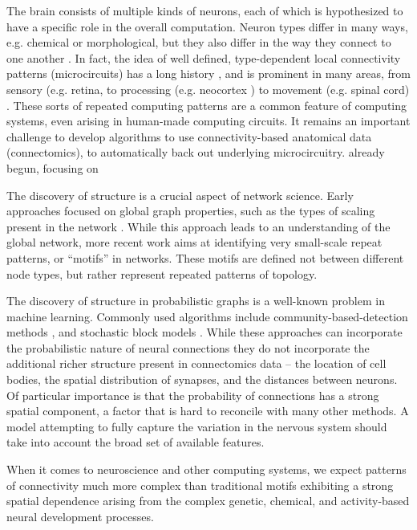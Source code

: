 \documentclass{article}
\begin{document}
The brain consists of multiple kinds of neurons, each of which is
hypothesized to have a specific role in the overall
computation. Neuron types differ in many ways, e.g. chemical or
morphological, but they also differ in the way they connect to one
another \autocite{Seung2014}. In fact, the idea of well defined,
type-dependent local connectivity patterns (microcircuits) has a long
history \autocite{Passingham2002}, and is prominent in many areas,
from sensory (e.g. retina, \autocite{Masland2001} to processing
(e.g. neocortex \autocite{Mountcastle1997}) to movement (e.g. spinal
cord) \autocite{Grillner2005}.  These sorts of repeated computing
patterns are a common feature of computing systems, even arising in
human-made computing circuits. It remains an important challenge to
develop algorithms to use connectivity-based anatomical data
(connectomics), to automatically back out underlying microcircuitry.
already begun, focusing on

The discovery of structure is a crucial aspect of network
science. Early approaches focused on global graph properties, such as
the types of scaling present in the network \autocite
{WattsStrogatz1998}.  While this approach leads to an understanding
of the global network, more recent work aims at identifying very small-scale
repeat patterns, or “motifs” in networks\autocite{Milo2002}. These motifs
are defined not between different node types, but rather represent repeated
patterns of topology. 

The discovery of structure in probabilistic graphs is a well-known
problem in machine learning. Commonly used algorithms include
community-based-detection methods \autocite{Girvan2002}, and
stochastic block models \autocite{Nowicki2001}.  While these
approaches can incorporate the probabilistic nature of neural
connections \autocite{Hill2012} they do not incorporate the additional
richer structure present in connectomics data -- the location of cell
bodies, the spatial distribution of synapses, and the distances
between neurons. Of particular importance is that the probability of
connections has a strong spatial component, a factor that is hard to
reconcile with many other methods. A model attempting to fully capture
the variation in the nervous system should take into account the broad
set of available features.

When it comes to neuroscience and other computing systems, we expect
patterns of connectivity much more complex than traditional motifs
exhibiting a strong spatial dependence arising from the complex
genetic, chemical, and activity-based neural development processes.
\end{document}
